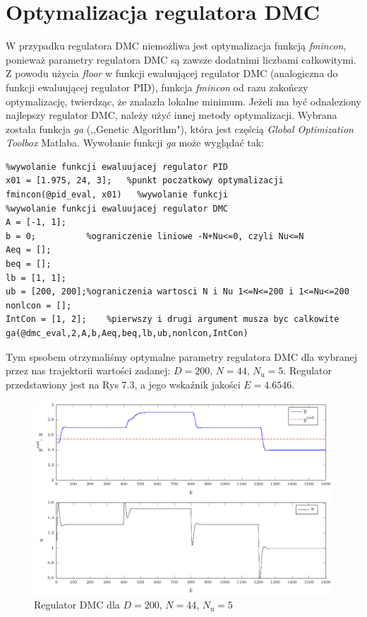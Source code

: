 \section{Optymalizacja regulatora DMC}


W przypadku regulatora DMC niemożliwa jest optymalizacja funkcją \emph{fmincon}, ponieważ parametry regulatora DMC są zawsze dodatnimi liczbami całkowitymi. Z powodu użycia \emph{floor} w funkcji ewaluującej regulator DMC (analogiczna do funkcji ewaluującej regulator PID), funkcja \emph{fmincon} od razu zakończy optymalizację, twierdząc, że znalazła lokalne minimum. Jeżeli ma być odnaleziony najlepszy regulator DMC, należy użyć innej metody optymalizacji. Wybrana została funkcja \emph{ga} (,,Genetic Algorithm"), która jest częścią \emph{Global Optimization Toolbox} Matlaba. Wywołanie funkcji \emph{ga} może wyglądać tak:

\begin{lstlisting}
%wywolanie funkcji ewaluujacej regulator PID
x01 = [1.975, 24, 3];   %punkt poczatkowy optymalizacji
fmincon(@pid_eval, x01)   %wywolanie funkcji
%wywolanie funkcji ewaluujacej regulator DMC
A = [-1, 1];      
b = 0;          %ograniczenie liniowe -N+Nu<=0, czyli Nu<=N
Aeq = [];
beq = [];
lb = [1, 1];
ub = [200, 200];%ograniczenia wartosci N i Nu 1<=N<=200 i 1<=Nu<=200
nonlcon = [];
IntCon = [1, 2];    %pierwszy i drugi argument musza byc calkowite
ga(@dmc_eval,2,A,b,Aeq,beq,lb,ub,nonlcon,IntCon)
\end{lstlisting}

Tym spsobem otrzymaliśmy optymalne parametry regulatora DMC dla wybranej przez nas trajektorii wartości zadanej: $D=200$, $N=44$, $N_{\mathrm{u}}=5$. Regulator przedstawiony jest na Rys 7.3, a jego wskaźnik jakości $E=\num{4.6546}$. 

\begin{figure}[tb] 
\centering 
\includegraphics[scale=1]{rysunki/zapisz_pdf/DMC_D=200.000_N=44.00_Nu=5.00.pdf} 
\caption{Regulator DMC dla $D=200$, $N=44$, $N_{\mathrm{u}}=5$} 
\label{r_pgfplots_DMC_D=200.000_N=44.00_Nu=5.00} 
\end{figure}